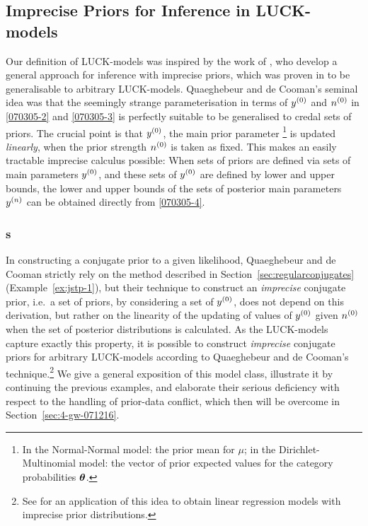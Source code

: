 \subsection{Imprecise Priors for Inference in LUCK-models}\label{sec:3}%

Our definition of LUCK-models was inspired by the work of
\textcite{2005:quaeghebeurcooman}, who develop a general approach for inference with
imprecise priors, which was proven in \textcite{Walter2007a} to be
generalisable to arbitrary LUCK-models. Quaeghebeur
and de Cooman's seminal idea was that the seemingly strange
parameterisation in terms of $y^{(0)}$ and $n^{(0)}$ in
\eqref{070305-2} and \eqref{070305-3} is perfectly suitable to be
generalised to credal sets of priors. The crucial point is that
$y^{(0)}$, the main prior parameter%
\footnote{In the Normal-Normal model: the prior mean for $\mu$;
in the Dirichlet-Multinomial model: the vector of prior expected values
for the category probabilities $\boldsymbol{\theta}$.}
is updated \emph{linearly}, when
the prior strength $n^{(0)}$ is taken as fixed. This makes an
easily tractable imprecise calculus possible: When sets of priors
are defined via sets of main parameters $y^{(0)}$, and these sets of
$y^{(0)}$ are defined by lower and upper bounds, the lower and upper
bounds of the sets of posterior main parameters $y^{(n)}$ can be
obtained directly from \eqref{070305-4}.

\subsubsection{\ymodel s}\label{070514-secImpPriorLUCK-QdC}

In constructing a conjugate prior to a given likelihood,
Quaeghebeur and de Cooman strictly rely on the method described in Section~\ref{sec:regularconjugates}
(Example~\ref{ex:jstp-1}), but their technique to construct an \emph{imprecise}
conjugate prior, i.e.\ a set of priors, by considering a set of
$y^{(0)}$, does not depend on this derivation, but rather on the
linearity of the updating of values of $y^{(0)}$ given $n^{(0)}$ when
the set of posterior distributions is calculated. As the
LUCK-models capture exactly this property, it is possible
to construct \emph{imprecise} conjugate priors for arbitrary
LUCK-models according to Quaeghebeur and de Cooman's
technique.\footnote{See \textcite{Walter2006a,Walter2007a,Walter2007b}
for an application of this idea to obtain
linear regression models with imprecise prior distributions.} We
give a general exposition of this model class, illustrate it by
continuing the previous examples, and elaborate their serious
deficiency with respect to the handling of prior-data conflict,
which then will be overcome in Section~\ref{sec:4-gw-071216}.

